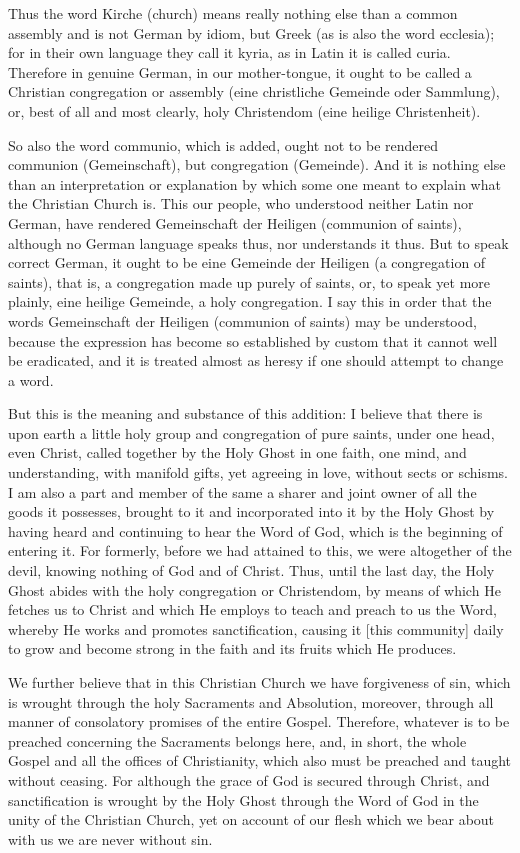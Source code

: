 Thus the word Kirche (church) means really nothing else than a common
assembly and is not German by idiom, but Greek (as is also the word
ecclesia); for in their own language they call it kyria, as in Latin it
is called curia. Therefore in genuine German, in our mother-tongue, it
ought to be called a Christian congregation or assembly (eine
christliche Gemeinde oder Sammlung), or, best of all and most clearly,
holy Christendom (eine heilige Christenheit).

So also the word communio, which is added, ought not to be rendered
communion (Gemeinschaft), but congregation (Gemeinde). And it is
nothing else than an interpretation or explanation by which some one
meant to explain what the Christian Church is. This our people, who
understood neither Latin nor German, have rendered Gemeinschaft der
Heiligen (communion of saints), although no German language speaks
thus, nor understands it thus. But to speak correct German, it ought to
be eine Gemeinde der Heiligen (a congregation of saints), that is, a
congregation made up purely of saints, or, to speak yet more plainly,
eine heilige Gemeinde, a holy congregation. I say this in order that
the words Gemeinschaft der Heiligen (communion of saints) may be
understood, because the expression has become so established by custom
that it cannot well be eradicated, and it is treated almost as heresy
if one should attempt to change a word.

But this is the meaning and substance of this addition: I believe that
there is upon earth a little holy group and congregation of pure
saints, under one head, even Christ, called together by the Holy Ghost
in one faith, one mind, and understanding, with manifold gifts, yet
agreeing in love, without sects or schisms. I am also a part and member
of the same a sharer and joint owner of all the goods it possesses,
brought to it and incorporated into it by the Holy Ghost by having
heard and continuing to hear the Word of God, which is the beginning of
entering it. For formerly, before we had attained to this, we were
altogether of the devil, knowing nothing of God and of Christ. Thus,
until the last day, the Holy Ghost abides with the holy congregation or
Christendom, by means of which He fetches us to Christ and which He
employs to teach and preach to us the Word, whereby He works and
promotes sanctification, causing it [this community] daily to grow and
become strong in the faith and its fruits which He produces.

We further believe that in this Christian Church we have forgiveness of
sin, which is wrought through the holy Sacraments and Absolution,
moreover, through all manner of consolatory promises of the entire
Gospel. Therefore, whatever is to be preached concerning the Sacraments
belongs here, and, in short, the whole Gospel and all the offices of
Christianity, which also must be preached and taught without ceasing.
For although the grace of God is secured through Christ, and
sanctification is wrought by the Holy Ghost through the Word of God in
the unity of the Christian Church, yet on account of our flesh which we
bear about with us we are never without sin.


